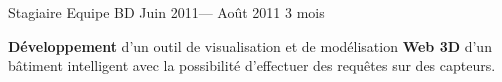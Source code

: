 \jobposition%
{Stagiaire}%
{Equipe BD}
{Juin 2011--- Août 2011}%
{3 mois}%
{
	\textbf{Développement} d’un outil de visualisation et de
	modélisation \textbf{Web 3D} d’un bâtiment intelligent avec la
	possibilité d’effectuer des requêtes sur des capteurs.

}

